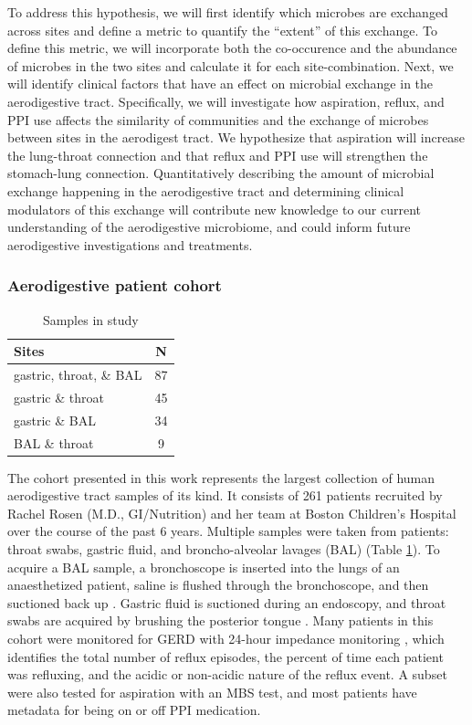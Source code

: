 \documentclass[12pt]{article}
\begin{document}
To address this hypothesis, we will first identify which microbes
are exchanged across sites and define a metric to quantify the ``extent'' of this exchange. 
To define this metric, we will incorporate both the co-occurence and the abundance
of microbes in the two sites and calculate it for each site-combination.
Next, we will identify clinical factors that have an effect on microbial
exchange in the aerodigestive tract. Specifically, we will investigate how aspiration,
reflux, and PPI use affects the similarity of communities and the
exchange of microbes between sites in the aerodigest tract.
We hypothesize that aspiration will increase the lung-throat connection and 
that reflux and PPI use will strengthen the stomach-lung connection.
Quantitatively describing the amount of microbial exchange happening in the
aerodigestive tract and determining clinical modulators of this exchange
will contribute new knowledge to our current understanding of the
aerodigestive microbiome, and could inform future aerodigestive
investigations and treatments.

\subsubsection{Aerodigestive patient cohort}

\begin{table}
\begin{tabular}{l c}
	\hline
	\textbf{Sites} & \textbf{N} \\
	\hline
	gastric, throat, \& BAL & 87 \\
	gastric \& throat & 45 \\
	gastric \& BAL & 34 \\
	BAL \& throat & 9 \\
	\hline 
\end{tabular}
\caption{Samples in study}\label{tab:rosen_samples}
\end{table}


The cohort presented in this work represents the largest collection of 
human aerodigestive tract samples of its kind.
It consists of 261 patients recruited by Rachel Rosen 
(M.D., GI/Nutrition) and her team at Boston Children's Hospital  
over the course of the past 6 years. Multiple samples were 
taken from patients: throat swabs, gastric fluid, and broncho-alveolar lavages (BAL) (Table \ref{tab:rosen_samples}). 
To acquire a BAL sample, a bronchoscope is inserted into the lungs 
of an anaesthetized patient, saline is flushed through the 
bronchoscope, and then suctioned back up \cite{charslon-topographical-2011}. 
Gastric fluid is suctioned during an endoscopy, and throat
swabs are acquired by brushing the posterior tongue \cite{rosen-ppi-2015}. 
Many patients in this cohort were monitored for GERD with 24-hour
impedance monitoring \cite{vakil-gerd_defn-2006}, which identifies the total number of reflux episodes,
the percent of time each patient was refluxing, and the acidic or non-acidic
nature of the reflux event. A subset were also tested for aspiration with
an MBS test, and most patients have metadata for being on or off PPI medication.
\end{document}
